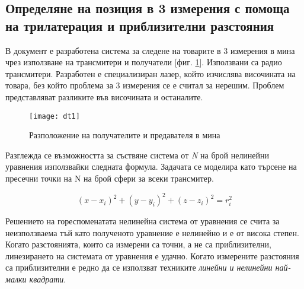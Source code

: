 \subsection{Определяне на позиция в 3 измерения с помоща на трилатерация и приблизителни разстояния}

В документ \cite{murphy} е разработена система за следене на товарите в 3 измерения в мина чрез използване на трансмитери и получатели [фиг. \ref{fig:mine}]. Използвани са радио трансмитери. Разработен е специализиран лазер, който изчислява височината на товара, без който проблема за 3 измерения се е считал за нерешим. Проблем представляват разликите във височината и останалите.

\begin{figure}
    \centering
    \centerline{\texttt{[image: dt1]}}
    \caption{Разположение на получателите и предавателя в мина}
    \label{fig:mine}
\end{figure}

Разглежда се възможността за съствяне система от \textit{N} на брой нелинейни уравнения използвайки следната формула. Задачата се моделира като търсене на пресечни точки на N на брой сфери за всеки трансмитер.

\begin{equation}
    (x-x_i)^2 + (y-y_i)^2 +(z-z_i)^2=r_i^2
\end{equation}

Решението на гореспоменатата нелинейна система от уравнения се счита за неизползваема тъй като полученото уравнение е нелинейно и е от висока степен. Когато разстоянията, които са измерени са точни, а не са приблизителни, линезирането на системата от уравнения е удачно. Когато измерените разстояния са приблизителни е редно да се използват техниките \textit{линейни и нелинейни най-малки квадрати}.  